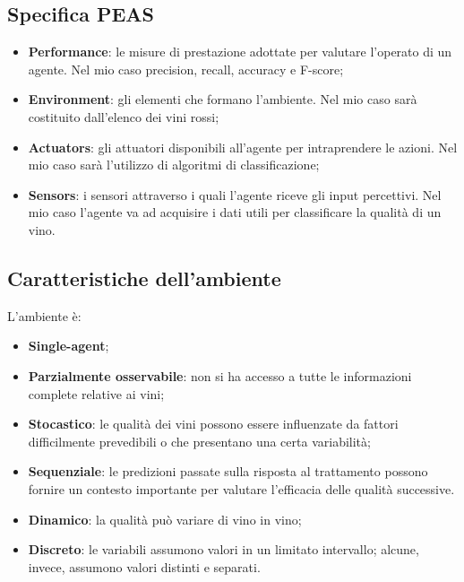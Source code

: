 \documentclass{article}
\begin{document}
\begin{titlepage}
        \subsection{Specifica PEAS}
        \begin{itemize}
            \item \textbf{Performance}: le misure di prestazione adottate per valutare l’operato di un agente. Nel mio caso precision, recall, accuracy e F-score;
            \item \textbf{Environment}:  gli elementi che formano l’ambiente. Nel mio caso sarà costituito dall'elenco dei vini rossi;
            \item \textbf{Actuators}: gli attuatori disponibili all’agente per intraprendere le azioni. Nel mio caso sarà l'utilizzo di algoritmi di classificazione;
            \item \textbf{Sensors}: i sensori attraverso i quali l'agente riceve gli input percettivi. Nel mio caso l'agente va ad acquisire i dati utili per classificare la qualità di un vino.
        \end{itemize}

        \newpage
        \subsection{Caratteristiche dell'ambiente}
        L'ambiente è:
        \begin{itemize}
            \item \textbf{Single-agent};
            \item \textbf{Parzialmente osservabile}: non si ha accesso a tutte le informazioni complete relative ai vini;
            \item \textbf{Stocastico}: le qualità dei vini possono essere influenzate da fattori  difficilmente prevedibili o che presentano una certa variabilità;
            \item \textbf{Sequenziale}:  le predizioni passate sulla risposta al trattamento possono
            fornire un contesto importante per valutare l’efficacia delle qualità successive.
            \item \textbf{Dinamico}: la qualità può variare di vino in vino;
            \item \textbf{Discreto}: le variabili assumono valori in un limitato intervallo; alcune, invece, assumono valori distinti e separati.
        \end{itemize}


\end{titlepage}
\end{document}
